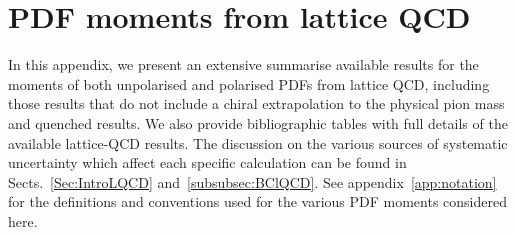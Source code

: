 \section{PDF moments from lattice QCD}
\label{sec:LQCDtables}

In this appendix, we present an extensive summarise available results for the moments of both 
unpolarised and polarised PDFs from lattice QCD, including those results 
that do not include a chiral extrapolation to the physical pion mass and 
quenched results. 
%
We also provide bibliographic tables with full
details of the available lattice-QCD results.
%
The discussion on the various sources of systematic uncertainty which
affect each specific calculation can be found in Sects.~\ref{Sec:IntroLQCD}
and~\ref{subsubsec:BClQCD}.
%
See appendix~\ref{app:notation} for the definitions and conventions used
for the various PDF moments considered here.

